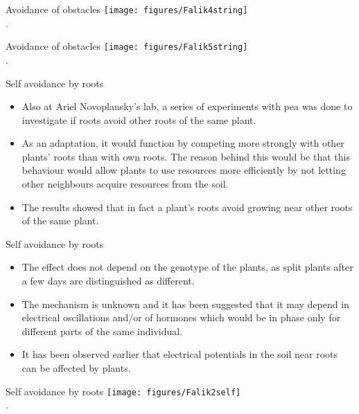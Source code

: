 \documentclass[10pt]{beamer}
\begin{document}
\begin{frame}{Avoidance of obstacles}
    \centering
    \texttt{[image: figures/Falik4string]}\\
    {\small \autocite[from][]{Falik2005}.}
\end{frame}

\begin{frame}{Avoidance of obstacles}
    \centering
    \texttt{[image: figures/Falik5string]}\\
    {\small \autocite[from][]{Falik2005}.}
\end{frame}

\begin{frame}{Self avoidance by roots}
    \begin{itemize}
        \item Also at Ariel Novoplansky's lab, a series of experiments with pea was done to investigate if roots avoid other roots of the same plant.
        \item As an adaptation, it would function by competing more strongly with other plants' roots than with own roots. The reason behind this would be that this behaviour would allow plants to use resources more efficiently by not letting other neighbours acquire resources from the soil.
        \item The results showed that in fact a plant's roots avoid growing near other roots of the same plant.
    \end{itemize}
\end{frame}

\begin{frame}{Self avoidance by roots}
    \begin{itemize}
        \item The effect does not depend on the genotype of the plants, as split plants after a few days are distinguished as different.
        \item The mechanism is unknown and it has been suggested that it may depend in electrical oscillations and/or of hormones which would be in phase only for different parts of the same individual.
        \item It has been observed earlier that electrical potentials in the soil near roots can be affected by plants.
    \end{itemize}
\end{frame}

\begin{frame}{Self avoidance by roots}
    \centering
    \texttt{[image: figures/Falik2self]}\\
    {\small \autocite[from][]{Falik2003}.}
\end{frame}
\end{document}

